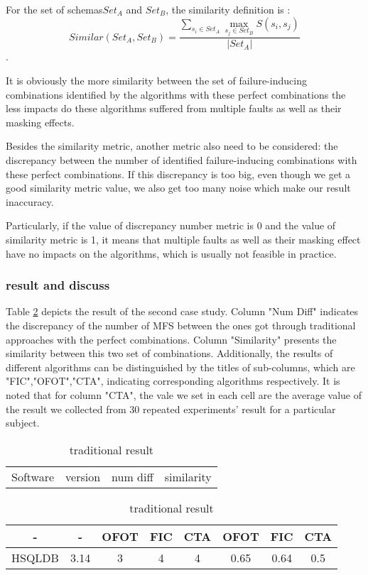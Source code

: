 \documentclass{sig-alternate}
\begin{document}
For the set of schemas$ Set_{A}$ and $Set_{B}$, the similarity definition is :
\begin{displaymath} Similar(Set_{A},Set_{B})= \frac{\sum _{s_{i}\in Set_{A}}\max _{s_{j}\in Set_{B}}S\left( s_{i},s_{j}\right)}{|Set_{A}|} \end{displaymath}.

It is obviously the more similarity between the set of failure-inducing combinations identified by the algorithms with these perfect combinations the less impacts do these algorithms suffered from multiple faults as well as their masking effects.

Besides the similarity metric, another metric also need to be considered: the discrepancy between the number of identified failure-inducing combinations with these perfect combinations. If this discrepancy is too big, even though we get a good similarity metric value, we also get too many noise which make our result inaccuracy.

Particularly, if the value of discrepancy number metric is 0 and the value of similarity metric is 1, it means that multiple faults as well as their masking effect have no impacts on the algorithms, which is usually not feasible in practice. 

\subsubsection{result and discuss}
Table \ref{traiditional_result} depicts the result of the second case study. Column "Num Diff" indicates the discrepancy of the number of MFS between the ones got through traditional approaches with the perfect combinations. Column "Similarity" presents the similarity between this two set of combinations. Additionally, the results of different algorithms can be distinguished by the titles of sub-columns, which are "FIC","OFOT","CTA", indicating corresponding algorithms respectively. It is noted that for column "CTA", the vale we set in each cell are the average value of the result we collected from 30 repeated experiments' result for a particular subject.

\begin{table}\renewcommand{\arraystretch}{1.3}
\caption{traditional result}
\label{traiditional_result}
\begin{tabular}{p{}|p{}|p{}|p{}} \hline
   Software & version  &  num diff & similarity
\end{tabular}

\begin{tabular}{c|c|c|c|c|c|c|c} \hline
	- & 		- &	OFOT	& FIC 	& CTA 	& OFOT 	& FIC 	& CTA  \\ \hline
HSQLDB &	 3.14 &	3	& 4 		& 4 		& 0.65 	& 0.64	&  0.5 \\
\hline\end{tabular}
\end{table}
\end{document}
